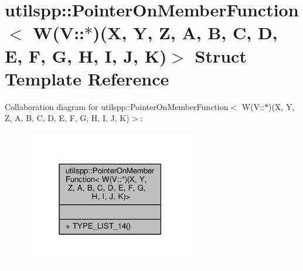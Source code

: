 \hypertarget{structutilspp_1_1PointerOnMemberFunction_3_01W_07V_1_1_5_08_07X_00_01Y_00_01Z_00_01A_00_01B_00_0b928f54f704c64390834c6654b40f718}{\section{utilspp\-:\-:Pointer\-On\-Member\-Function$<$ W(V\-:\-:$\ast$)(X, Y, Z, A, B, C, D, E, F, G, H, I, J, K)$>$ Struct Template Reference}
\label{structutilspp_1_1PointerOnMemberFunction_3_01W_07V_1_1_5_08_07X_00_01Y_00_01Z_00_01A_00_01B_00_0b928f54f704c64390834c6654b40f718}
}


Collaboration diagram for utilspp\-:\-:Pointer\-On\-Member\-Function$<$ W(V\-:\-:$\ast$)(X, Y, Z, A, B, C, D, E, F, G, H, I, J, K)$>$\-:\nopagebreak
\begin{figure}[H]
\begin{center}
\leavevmode
\includegraphics[width=210pt]{structutilspp_1_1PointerOnMemberFunction_3_01W_07V_1_1_5_08_07X_00_01Y_00_01Z_00_01A_00_01B_00_0ff923ded593e17984f4fc6573d950d8d}
\end{center}
\end{figure}
